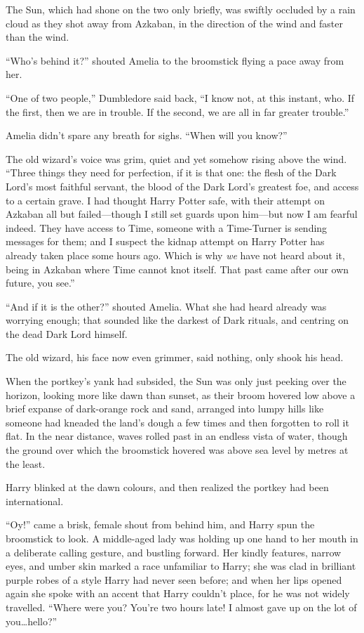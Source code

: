 \later

The Sun, which had shone on the two only briefly, was swiftly occluded by a rain cloud as they shot away from Azkaban, in the direction of the wind and faster than the wind.

“Who’s behind it?” shouted Amelia to the broomstick flying a pace away from her.

“One of two people,” Dumbledore said back, “I know not, at this instant, who. If the first, then we are in trouble. If the second, we are all in far greater trouble.”

Amelia didn’t spare any breath for sighs. “When will you know?”

The old wizard’s voice was grim, quiet and yet somehow rising above the wind. “Three things they need for perfection, if it is that one: the flesh of the Dark Lord’s most faithful servant, the blood of the Dark Lord’s greatest foe, and access to a certain grave. I had thought Harry Potter safe, with their attempt on Azkaban all but failed—though I still set guards upon him—but now I am fearful indeed. They have access to Time, someone with a Time-Turner is sending messages for them; and I suspect the kidnap attempt on Harry Potter has already taken place some hours ago. Which is why \emph{we} have not heard about it, being in Azkaban where Time cannot knot itself. That past came after our own future, you see.”

“And if it is the other?” shouted Amelia. What she had heard already was worrying enough; that sounded like the darkest of Dark rituals, and centring on the dead Dark Lord himself.

The old wizard, his face now even grimmer, said nothing, only shook his head.

\later

When the portkey’s yank had subsided, the Sun was only just peeking over the horizon, looking more like dawn than sunset, as their broom hovered low above a brief expanse of dark-orange rock and sand, arranged into lumpy hills like someone had kneaded the land’s dough a few times and then forgotten to roll it flat. In the near distance, waves rolled past in an endless vista of water, though the ground over which the broomstick hovered was above sea level by metres at the least.

Harry blinked at the dawn colours, and then realized the portkey had been international.

“Oy!” came a brisk, female shout from behind him, and Harry spun the broomstick to look. A middle-aged lady was holding up one hand to her mouth in a deliberate calling gesture, and bustling forward. Her kindly features, narrow eyes, and umber skin marked a race unfamiliar to Harry; she was clad in brilliant purple robes of a style Harry had never seen before; and when her lips opened again she spoke with an accent that Harry couldn’t place, for he was not widely travelled. “Where were you? You’re two hours late! I almost gave up on the lot of you…hello?”

